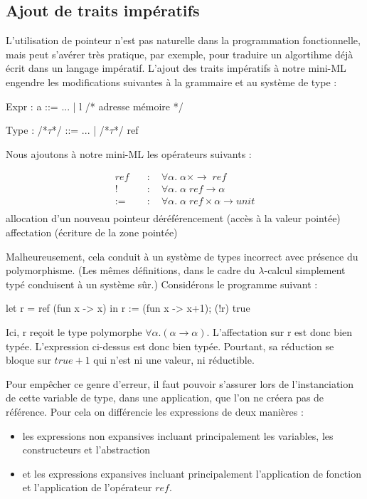 \documentclass[a4paper, 11pt]{article}
\begin{document}
\subsection{Ajout de traits impératifs}

L'utilisation de pointeur n'est pas naturelle dans la programmation fonctionnelle, mais peut s'avérer très pratique, par exemple, pour traduire un algortihme déjà écrit dans un langage impératif.
L'ajout des traits impératifs à notre mini-ML engendre les modifications suivantes à la grammaire et au système de type :

\begin{OCaml}
Expr : a ::= ... | l             /* adresse mémoire */ 
\end{OCaml}
\begin{OCaml}
Type : /*$\tau$*/ ::= ... | /*$\tau$*/ ref
\end{OCaml}

\noindent
Nous ajoutons à notre mini-ML les opérateurs suivants :
\begin{multicols}{2}
\begin{align*}
  ref \quad &: \quad \forall \alpha. \; \alpha \times \rightarrow \; ref\\
  ! \quad &: \quad  \forall \alpha. \; \alpha \; ref \rightarrow \alpha\\
  := \quad &:  \quad  \forall \alpha. \; \alpha \; ref \times \alpha \rightarrow unit\\
\end{align*}
allocation d'un nouveau pointeur
déréférencement (accès à la valeur pointée)
affectation (écriture de la zone pointée)
\end{multicols}


Malheureusement, cela conduit à un système de types incorrect avec présence du polymorphisme. (Les mêmes définitions, dans le cadre du $\lambda$-calcul simplement typé conduisent à un système sûr.)
Considérons le programme suivant :
\begin{OCaml}
let r = ref (fun x -> x) in
   r := (fun x -> x+1);
  (!r) true
\end{OCaml}
Ici, r reçoit le type polymorphe $\forall \alpha. (\alpha \rightarrow \alpha)$. L'affectation sur r est donc bien typée. L'expression ci-dessus est donc bien typée. Pourtant, sa réduction se bloque sur $true+1$ qui n'est ni une valeur, ni réductible.

Pour empêcher ce genre d'erreur, il faut pouvoir s’assurer lors de l’instanciation de cette variable de type, dans une
application, que l’on ne créera pas de référence.
Pour cela on différencie les expressions de deux manières : 
\begin{itemize}
\item les expressions non expansives incluant principalement les
variables, les constructeurs et l’abstraction 
\item et les expressions
expansives incluant principalement l’application de fonction et l'application de l'opérateur $ref$.
\end{itemize}
\end{document}
